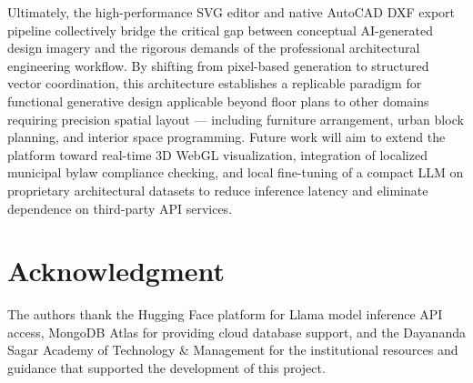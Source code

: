 \documentclass[10pt, twocolumn, letterpaper]{article}
\begin{document}
Ultimately, the high-performance SVG editor and native AutoCAD DXF export
pipeline collectively bridge the critical gap between conceptual AI-generated
design imagery and the rigorous demands of the professional architectural
engineering workflow. By shifting from pixel-based generation to structured
vector coordination, this architecture establishes a replicable paradigm for
functional generative design applicable beyond floor plans to other domains
requiring precision spatial layout --- including furniture arrangement,
urban block planning, and interior space programming. Future work will aim
to extend the platform toward real-time 3D WebGL visualization, integration
of localized municipal bylaw compliance checking, and local fine-tuning of a
compact LLM on proprietary architectural datasets to reduce inference latency
and eliminate dependence on third-party API services.

\section*{Acknowledgment}
The authors thank the Hugging Face platform for Llama model inference API
access, MongoDB Atlas for providing cloud database support, and the
Dayananda Sagar Academy of Technology \& Management for the institutional
resources and guidance that supported the development of this project.
\end{document}
